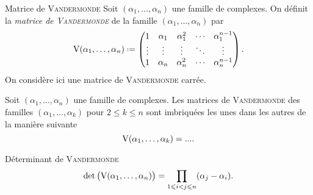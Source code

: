 \begin{defi}{Matrice de \textsc{Vandermonde}}
    Soit $(\alpha_1, \dots, \alpha_n)$ une famille de complexes. On définit la \emph{matrice de \textsc{Vandermonde}} de la famille $(\alpha_1, \dots, \alpha_n)$ par
    $$\Vandermonde(\alpha_1, \dots, \alpha_n) \defeq \begin{pmatrix}
    1 & \alpha_1 & \alpha_1^2 & \cdots & \alpha_1^{n-1} \\
    \vdots & \vdots & \vdots & \ddots & \vdots \\
    1 & \alpha_n & \alpha_n^2 & \cdots & \alpha_n^{n-1}
    \end{pmatrix}.$$
    On considère ici une matrice de \textsc{Vandermonde} carrée.
\end{defi}

\newcommand{\vandk}{
\left(\begin{gathered}
    [every node/.style={anchor=south west}]
        \node[mitikzpicturenimum width=2cm,minimum height=1.5cm] at (-0.16,0.625) {$\Vandermonde(\alpha_1, \dots, \alpha_{k-1})$};
        \node[minimum width=0.5cm,minimum height=0.5cm] at (0,0.05) {$1$};
        \node[minimum width=0.5cm,minimum height=0.5cm] at (0.4, 0) {$\alpha_{k}$};
        \node[minimum width=0.5cm,minimum height=0.5cm] at (0.95,0) {$\cdots$};
        \node[minimum width=0.5cm,minimum height=0.5cm] at (1.5,0) {$\alpha_{k}^{k-2}$};
        \node[minimum width=1cm,minimum height=0.5cm] at (2.5,0) {$\alpha_{k}^{k-1}$};
        \node[minimum width=1cm,minimum height=1cm] at (2.5,0.4) {$\alpha_{k-1}^{k-1}$};
        \node[minimum width=1cm,minimum height=1cm] at (2.5,1) {$\vdots$};
        \node[minimum width=1cm,minimum height=1cm] at (2.5,1.4) {$\alpha_1^{k-1}$};
        \draw (0,0.6) -- (2.5,0.6);
        \draw (2.5,0.6) -- (2.5,2.225);
        \draw[dashed] (2.5,0.6) -- (3.5,0.6);
        \draw[dashed] (2.5,0.6) -- (2.5,0);
    \endtikzpicture
    \end{gathered}\right)
}

\begin{remarque}
    Soit $(\alpha_1, \dots, \alpha_n)$ une famille de complexes. Les matrices de \textsc{Vandermonde} des familles $(\alpha_1, \dots, \alpha_k)$ pour $2 \leqslant k \leqslant n$ sont imbriquées les unes dans les autres de la manière suivante
    $$\mathrm{V}(\alpha_1, \dots, \alpha_k) = ....$$
\end{remarque}

\begin{prop}{Déterminant de \textsc{Vandermonde}} 
    $$\det \big( \mathrm{V}(\alpha_1, \dots, \alpha_n) \big) = \prod_{1\leqslant i < j \leqslant n}(\alpha_j - \alpha_i).$$
\end{prop}

